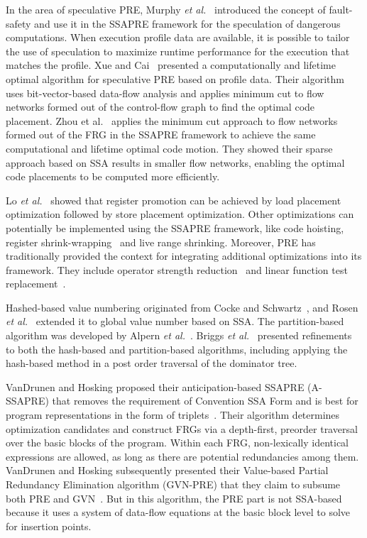 In the area of speculative PRE, Murphy {\it et al.}~\cite{Murphy08} introduced the concept of fault-safety and use it in the SSAPRE framework for the speculation of dangerous computations. 
When execution profile data are available, it is possible to tailor the use of speculation to maximize runtime performance for the execution that matches the profile. 
Xue and Cai~\cite{Xue06} presented a computationally and lifetime optimal algorithm for speculative PRE based on profile data. 
Their algorithm uses bit-vector-based data-flow analysis and applies minimum cut to flow networks formed out of the control-flow graph to find the optimal code placement. 
Zhou {et al.}~\cite{zhou11} applies the minimum cut approach to flow networks formed out of the FRG in the SSAPRE framework to achieve the same computational and lifetime optimal code motion. 
They showed their sparse approach based on SSA results in smaller flow networks, enabling the optimal code placements to be computed more efficiently.

Lo {\it et al.}~\cite{Lo98} showed that register promotion can be achieved by load placement optimization followed by store placement optimization. 
Other optimizations can potentially be implemented using the SSAPRE framework, like code hoisting, register shrink-wrap\-ping~\cite{Chow88} and live range shrinking. 
Moreover, PRE has traditionally provided the context for integrating additional optimizations into its framework. 
They include operator strength reduction~\cite{Knoop93} and linear function test replacement~\cite{Kennedy98}.

Hashed-based value numbering originated from Cocke and Schwartz~\cite{CS70}, and Rosen {\it et al.}~\cite{Rosen88} extended it to global value number based on SSA. 
The partition-based algorithm was developed by Alpern {\it et al.}~\cite{AWZ88}. 
Briggs {\it et al.}~\cite{Briggs97} presented refinements to both the hash-based and partition-based algorithms, including applying the hash-based method in a post order traversal of the dominator tree.

VanDrunen and Hosking proposed their anticipation-based SSAPRE (A-SSAPRE) that removes the requirement of Convention SSA Form and is best for program representations in the form of triplets~\cite{Vandrunen03}. 
Their algorithm determines optimization candidates and construct FRGs via a depth-first, preorder traversal over the basic blocks of the program. 
Within each FRG, non-lexically identical expressions are allowed, as long as there are potential redundancies among them. 
VanDrunen and Hosking subsequently presented their Value-based Partial Redundancy Elimination algorithm (GVN-PRE) that they claim to subsume both PRE and GVN~\cite{Vandrunen04}. 
But in this algorithm, the PRE part is not SSA-based because it uses a system of data-flow equations at the basic block level to solve for insertion points.
